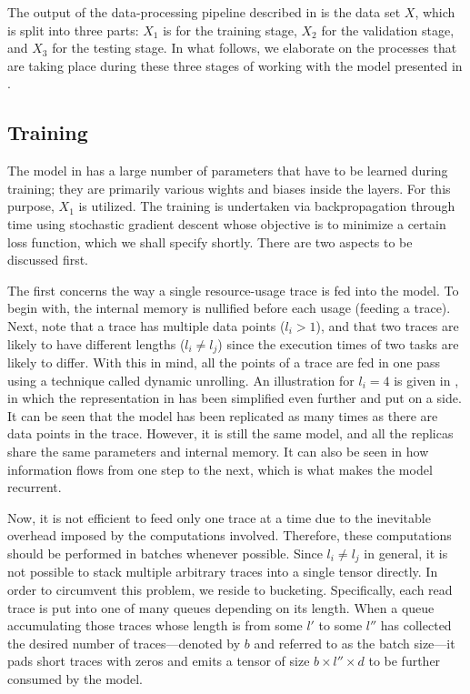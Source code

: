 The output of the data-processing pipeline described in  is the data
set $X$, which is split into three parts: $X_1$ is for the training stage, $X_2$
for the validation stage, and $X_3$ for the testing stage. In what follows, we
elaborate on the processes that are taking place during these three stages of
working with the model presented in .

\subsection{Training} 
The model in  has a large number of parameters that have to be
learned during training; they are primarily various wights and biases inside the
layers. For this purpose, $X_1$ is utilized. The training is undertaken via
backpropagation through time using stochastic gradient descent
\cite{goodfellow2016} whose objective is to minimize a certain loss function,
which we shall specify shortly. There are two aspects to be discussed first.


The first concerns the way a single resource-usage trace is fed into the model.
To begin with, the internal memory is nullified before each usage (feeding a
trace). Next, note that a trace has multiple data points ($l_i > 1$), and that
two traces are likely to have different lengths ($l_i \neq l_j$) since the
execution times of two tasks are likely to differ. With this in mind, all the
points of a trace are fed in one pass using a technique called dynamic
unrolling. An illustration for $l_i = 4$ is given in , in which the
representation in  has been simplified even further and put on a
side. It can be seen that the model has been replicated as many times as there
are data points in the trace. However, it is still the same model, and all the
replicas share the same parameters and internal memory. It can also be seen in
 how information flows from one step to the next, which is what
makes the model recurrent.

Now, it is not efficient to feed only one trace at a time due to the inevitable
overhead imposed by the computations involved. Therefore, these computations
should be performed in batches whenever possible. Since $l_i \neq l_j$ in
general, it is not possible to stack multiple arbitrary traces into a single
tensor directly. In order to circumvent this problem, we reside to bucketing.
Specifically, each read trace is put into one of many queues depending on its
length. When a queue accumulating those traces whose length is from some $l'$ to
some $l''$ has collected the desired number of traces---denoted by $b$ and
referred to as the batch size---it pads short traces with zeros and emits a
tensor of size $b \times l'' \times d$ to be further consumed by the model.

